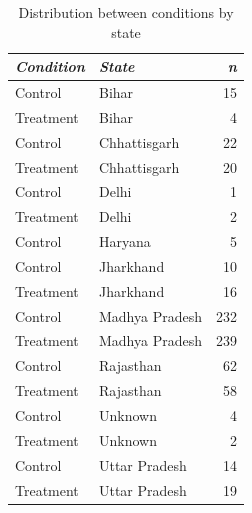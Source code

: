 \documentclass[empirical, authordate, issue]{jote-new-article}
\begin{document}
\begin{table}

  \caption{Distribution between conditions by state}
  \label{tab:tableS40}


  \begin{tabularx}{\linewidth}{@{} X  l  r@{}}

    \toprule
    \emph{Condition} & \emph{State}   & \emph{n} \\
    \midrule
    Control          & Bihar          & 15       \\
    Treatment        & Bihar          & 4        \\
    Control          & Chhattisgarh   & 22       \\
    Treatment        & Chhattisgarh   & 20       \\
    Control          & Delhi          & 1        \\
    Treatment        & Delhi          & 2        \\
    Control          & Haryana        & 5        \\
    Control          & Jharkhand      & 10       \\
    Treatment        & Jharkhand      & 16       \\
    Control          & Madhya Pradesh & 232      \\
    Treatment        & Madhya Pradesh & 239      \\
    Control          & Rajasthan      & 62       \\
    Treatment        & Rajasthan      & 58       \\
    Control          & Unknown        & 4        \\
    Treatment        & Unknown        & 2        \\
    Control          & Uttar Pradesh  & 14       \\
    Treatment        & Uttar Pradesh  & 19       \\
    \bottomrule
  \end{tabularx}


\end{table}
\clearpage
\end{document}
